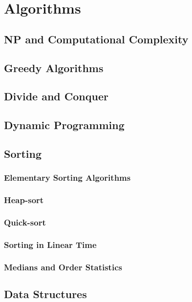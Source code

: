 \part{Algorithms}
	\chapter{NP and Computational Complexity}

	\chapter{Greedy Algorithms}

	\chapter{Divide and Conquer}

	\chapter{Dynamic Programming}

	\chapter{Sorting}
		\section{Elementary Sorting Algorithms}

		\section{Heap-sort}

		\section{Quick-sort}

		\section{Sorting in Linear Time}

		\section{Medians and Order Statistics}

	\chapter{Data Structures}
